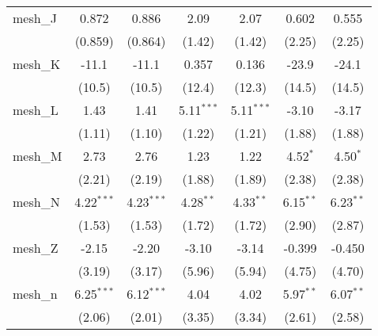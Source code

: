 \begin{tabular}{lcccccc}
   mesh\_J                                                     & 0.872         & 0.886         & 2.09          & 2.07          & 0.602         & 0.555\\   
                                                               & (0.859)       & (0.864)       & (1.42)        & (1.42)        & (2.25)        & (2.25)\\   
   mesh\_K                                                     & -11.1         & -11.1         & 0.357         & 0.136         & -23.9         & -24.1\\   
                                                               & (10.5)        & (10.5)        & (12.4)        & (12.3)        & (14.5)        & (14.5)\\   
   mesh\_L                                                     & 1.43          & 1.41          & 5.11$^{***}$  & 5.11$^{***}$  & -3.10         & -3.17\\   
                                                               & (1.11)        & (1.10)        & (1.22)        & (1.21)        & (1.88)        & (1.88)\\   
   mesh\_M                                                     & 2.73          & 2.76          & 1.23          & 1.22          & 4.52$^{*}$    & 4.50$^{*}$\\   
                                                               & (2.21)        & (2.19)        & (1.88)        & (1.89)        & (2.38)        & (2.38)\\   
   mesh\_N                                                     & 4.22$^{***}$  & 4.23$^{***}$  & 4.28$^{**}$   & 4.33$^{**}$   & 6.15$^{**}$   & 6.23$^{**}$\\   
                                                               & (1.53)        & (1.53)        & (1.72)        & (1.72)        & (2.90)        & (2.87)\\   
   mesh\_Z                                                     & -2.15         & -2.20         & -3.10         & -3.14         & -0.399        & -0.450\\   
                                                               & (3.19)        & (3.17)        & (5.96)        & (5.94)        & (4.75)        & (4.70)\\   
   mesh\_n                                                     & 6.25$^{***}$  & 6.12$^{***}$  & 4.04          & 4.02          & 5.97$^{**}$   & 6.07$^{**}$\\   
                                                               & (2.06)        & (2.01)        & (3.35)        & (3.34)        & (2.61)        & (2.58)\\   

\end{tabular}

